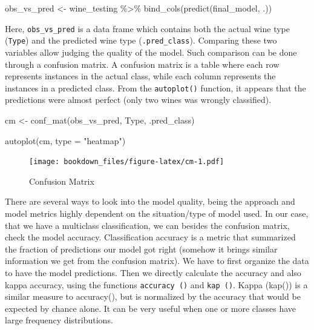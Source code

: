 \documentclass[
]{krantz}
\makeatletter
\newenvironment{Shaded}{\begin{snugshade}}{\end{snugshade}}
\newcommand{\AttributeTok}[1]{\textcolor[rgb]{0.61,0.61,0.61}{#1}}
\newcommand{\FunctionTok}[1]{\textcolor[rgb]{0,0,0}{#1}}
\newcommand{\NormalTok}[1]{#1}
\newcommand{\OtherTok}[1]{\textcolor[rgb]{0.37,0.37,0.37}{#1}}
\newcommand{\SpecialCharTok}[1]{\textcolor[rgb]{0,0,0}{#1}}
\newcommand{\StringTok}[1]{\textcolor[rgb]{0.5,0.5,0.5}{#1}}
\newenvironment{kframe}{%
\medskip{}
\setlength{\fboxsep}{.8em}
 \def\at@end@of@kframe{}%
 \ifinner\ifhmode%
  \def\at@end@of@kframe{\end{minipage}}%
  \begin{minipage}{\columnwidth}%
 \fi\fi%
 \def\FrameCommand##1{\hskip\@totalleftmargin \hskip-\fboxsep
 \colorbox{shadecolor}{##1}\hskip-\fboxsep
     \hskip-\linewidth \hskip-\@totalleftmargin \hskip\columnwidth}%
 \MakeFramed {\advance\hsize-\width
   \@totalleftmargin\z@ \linewidth\hsize
   \@setminipage}}%
 {\par\unskip\endMakeFramed%
 \at@end@of@kframe}
\renewenvironment{Shaded}{\begin{kframe}}{\end{kframe}}
\makeatother
\begin{document}
\begin{Shaded}
\begin{Highlighting}[]
\NormalTok{obs\_vs\_pred }\OtherTok{\textless{}{-}}\NormalTok{ wine\_testing }\SpecialCharTok{\%\textgreater{}\%}
  \FunctionTok{bind\_cols}\NormalTok{(}\FunctionTok{predict}\NormalTok{(final\_model, .))}
\end{Highlighting}
\end{Shaded}

Here, \texttt{obs\_vs\_pred} is a data frame which contains both the actual wine type (\texttt{Type}) and the predicted wine type (\texttt{.pred\_class}). Comparing these two variables allow judging the quality of the model. Such comparison can be done through a confusion matrix. A confusion matrix is a table where each row represents instances in the actual class, while each column represents the instances in a predicted class. From the \texttt{autoplot()} function, it appears that the predictions were almost perfect (only two wines was wrongly classified).

\begin{Shaded}
\begin{Highlighting}[]
\NormalTok{cm }\OtherTok{\textless{}{-}} \FunctionTok{conf\_mat}\NormalTok{(obs\_vs\_pred, Type, .pred\_class)}

\FunctionTok{autoplot}\NormalTok{(cm, }\AttributeTok{type =} \StringTok{"heatmap"}\NormalTok{)}
\end{Highlighting}
\end{Shaded}

\begin{figure}
\centering
\texttt{[image: bookdown\_files/figure-latex/cm-1.pdf]}
\caption{\label{fig:cm}Confusion Matrix}
\end{figure}

There are several ways to look into the model quality, being the approach and model metrics highly dependent on the situation/type of model used. In our case, that we have a multiclass classification, we can besides the confusion matrix, check the model accuracy. Classification accuracy is a metric that summarized the fraction of predictions our model got right (somehow it brings similar information we get from the confusion matrix). We have to first organize the data to have the model predictions. Then we directly calculate the accuracy and also kappa accuracy, using the functions \texttt{accuracy\ ()} and \texttt{kap\ ()}. Kappa (kap()) is a similar measure to accuracy(), but is normalized by the accuracy that would be expected by chance alone. It can be very useful when one or more classes have large frequency distributions.
\end{document}
